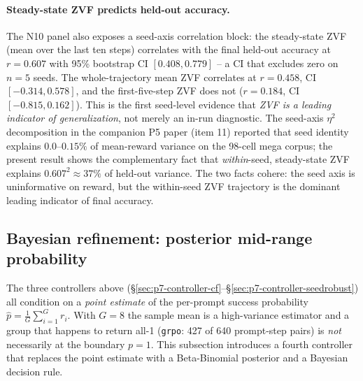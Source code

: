 \documentclass{article}
\begin{document}
\paragraph{Steady-state ZVF predicts held-out accuracy.}
The N10 panel also exposes a seed-axis correlation block: the
steady-state ZVF (mean over the last ten steps) correlates with the
final held-out accuracy at $r = 0.607$ with 95\% bootstrap CI
$[0.408, 0.779]$ -- a CI that excludes zero on $n{=}5$ seeds. The
whole-trajectory mean ZVF correlates at $r = 0.458$, CI
$[-0.314, 0.578]$, and the first-five-step ZVF does not
($r = 0.184$, CI $[-0.815, 0.162]$). This is the first seed-level
evidence that \emph{ZVF is a leading indicator of generalization}, not
merely an in-run diagnostic. The seed-axis $\eta^2$ decomposition in
the companion P5 paper (item 11) reported that seed identity explains
$0.0$--$0.15\%$ of mean-reward variance on the 98-cell mega corpus;
the present result shows the complementary fact that \emph{within}-seed,
steady-state ZVF explains $0.607^2 \approx 37\%$ of held-out
variance. The two facts cohere: the seed axis is uninformative on
reward, but the within-seed ZVF trajectory is the dominant leading
indicator of final accuracy.

\subsection{Bayesian refinement: posterior mid-range probability}
\label{sec:p7-bayesian}
The three controllers above (\S\ref{sec:p7-controller-cf}--\S\ref{sec:p7-controller-seedrobust})
all condition on a \emph{point estimate} of the per-prompt success
probability $\hat p = \frac{1}{G}\sum_{i=1}^G r_i$. With $G{=}8$ the
sample mean is a high-variance estimator and a group that happens
to return all-1 (\texttt{grpo}: 427 of 640 prompt-step pairs) is
\emph{not} necessarily at the boundary $p{=}1$. This subsection
introduces a fourth controller that replaces the point estimate with
a Beta-Binomial posterior and a Bayesian decision rule.
\end{document}
